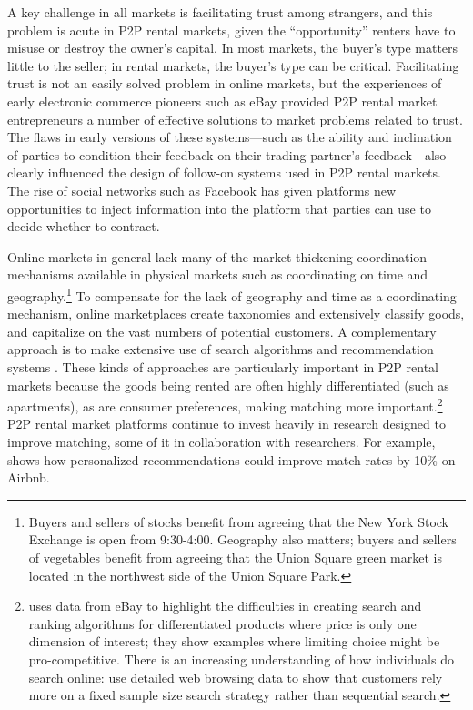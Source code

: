 \documentclass[11pt]{article}
\begin{document}
A key challenge in all markets is facilitating trust among strangers, and this problem is acute in P2P rental markets, given the ``opportunity'' renters have to misuse or destroy the owner's capital.
In most markets, the buyer's type matters little to the seller; in rental markets, the buyer's type can be critical. 
Facilitating trust is not an easily solved problem in online markets, but the experiences of early electronic commerce pioneers such as eBay provided P2P rental market entrepreneurs a number of effective solutions to market problems related to trust. 
The flaws in early versions of these systems---such as the ability and inclination of parties to condition their feedback on their trading partner's feedback---also clearly influenced the design of follow-on systems used in P2P rental markets. 
The rise of social networks such as Facebook has given platforms new opportunities to inject information into the platform that parties can use to decide whether to contract. 

Online markets in general lack many of the market-thickening coordination mechanisms available in physical markets such as coordinating on time and geography.\footnote{
  Buyers and sellers of stocks benefit from agreeing that the New York Stock Exchange is open from 9:30-4:00.
  Geography also matters; buyers and sellers of vegetables benefit from agreeing that the Union Square green market is located in the northwest side of the Union Square Park.
}
To compensate for the lack of geography and time as a coordinating mechanism, online marketplaces create taxonomies and extensively classify goods, and capitalize on the vast numbers of potential customers.
A complementary approach is to make extensive use of search algorithms and recommendation systems \citep{resnick1997recommender, adomavicius2005toward}.
These kinds of approaches are particularly important in P2P rental markets because the goods being rented are often highly differentiated (such as apartments), as are consumer preferences, making matching more important.\footnote{
  \cite{dinerstein2014consumer} uses data from eBay to highlight the difficulties in creating search and ranking algorithms for differentiated products where price is only one dimension of interest; they show examples where limiting choice might be pro-competitive.
  There is an increasing understanding of how individuals do search online: 
  \cite{de2012testing} use detailed web browsing data to show that customers rely more on a fixed sample size search strategy rather than sequential search.  
}
P2P rental market platforms continue to invest heavily in research designed to improve matching, some of it in collaboration with researchers. 
For example, \cite{fradkin2013search} shows how personalized recommendations could improve match rates by 10\% on Airbnb. 
\end{document}

